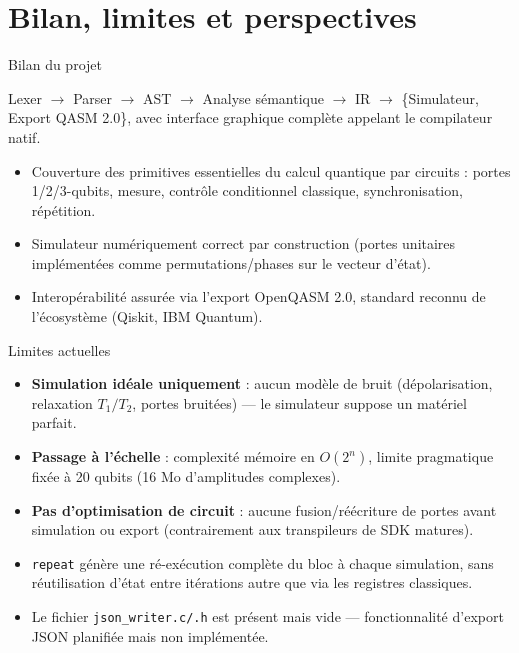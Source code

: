 \documentclass[10pt]{beamer}
\begin{document}
\section{Bilan, limites et perspectives}

\begin{frame}{Bilan du projet}
  \begin{keybox}[title=Ce qui est fonctionnel de bout en bout]
    \small
    Lexer $\to$ Parser $\to$ AST $\to$ Analyse sémantique $\to$ IR $\to$ \{Simulateur, Export QASM 2.0\}, avec interface graphique complète appelant le compilateur natif.
  \end{keybox}
  \vspace{4pt}
  \begin{itemize}
    \item Couverture des primitives essentielles du calcul quantique par circuits : portes 1/2/3-qubits, mesure, contrôle conditionnel classique, synchronisation, répétition.
    \item Simulateur numériquement correct par construction (portes unitaires implémentées comme permutations/phases sur le vecteur d'état).
    \item Interopérabilité assurée via l'export OpenQASM 2.0, standard reconnu de l'écosystème (Qiskit, IBM Quantum).
  \end{itemize}
\end{frame}

\begin{frame}{Limites actuelles}
  \begin{itemize}
    \item \textbf{Simulation idéale uniquement} : aucun modèle de bruit (dépolarisation, relaxation $T_1/T_2$, portes bruitées) --- le simulateur suppose un matériel parfait.
    \item \textbf{Passage à l'échelle} : complexité mémoire en $O(2^n)$, limite pragmatique fixée à 20 qubits (16 Mo d'amplitudes complexes).
    \item \textbf{Pas d'optimisation de circuit} : aucune fusion/réécriture de portes avant simulation ou export (contrairement aux transpileurs de SDK matures).
    \item \texttt{repeat} génère une ré-exécution complète du bloc à chaque simulation, sans réutilisation d'état entre itérations autre que via les registres classiques.
    \item Le fichier \texttt{json\_writer.c/.h} est présent mais vide --- fonctionnalité d'export JSON planifiée mais non implémentée.
  \end{itemize}
\end{frame}
\end{document}
